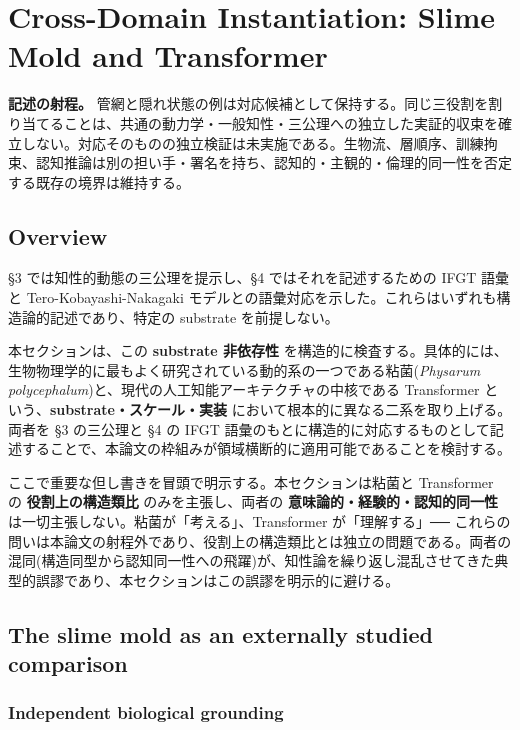 \section{Cross-Domain Instantiation: Slime Mold and Transformer}

\noindent\textbf{記述の射程。} 管網と隠れ状態の例は対応候補として保持する。同じ三役割を割り当てることは、共通の動力学・一般知性・三公理への独立した実証的収束を確立しない。対応そのものの独立検証は未実施である。生物流、層順序、訓練拘束、認知推論は別の担い手・署名を持ち、認知的・主観的・倫理的同一性を否定する既存の境界は維持する。



\subsection{Overview}


\S{}3 では知性的動態の三公理を提示し、\S{}4 ではそれを記述するための IFGT 語彙と Tero-Kobayashi-Nakagaki モデルとの語彙対応を示した。これらはいずれも構造論的記述であり、特定の substrate を前提しない。

本セクションは、この \textbf{substrate 非依存性} を構造的に検査する。具体的には、生物物理学的に最もよく研究されている動的系の一つである粘菌(\emph{Physarum polycephalum})と、現代の人工知能アーキテクチャの中核である Transformer という、\textbf{substrate・スケール・実装} において根本的に異なる二系を取り上げる。両者を \S{}3 の三公理と \S{}4 の IFGT 語彙のもとに構造的に対応するものとして記述することで、本論文の枠組みが領域横断的に適用可能であることを検討する。

ここで重要な但し書きを冒頭で明示する。本セクションは粘菌と Transformer の \textbf{役割上の構造類比} のみを主張し、両者の \textbf{意味論的・経験的・認知的同一性} は一切主張しない。粘菌が「考える」、Transformer が「理解する」── これらの問いは本論文の射程外であり、役割上の構造類比とは独立の問題である。両者の混同(構造同型から認知同一性への飛躍)が、知性論を繰り返し混乱させてきた典型的誤謬であり、本セクションはこの誤謬を明示的に避ける。

\subsection{The slime mold as an externally studied comparison}


\subsubsection{Independent biological grounding}


